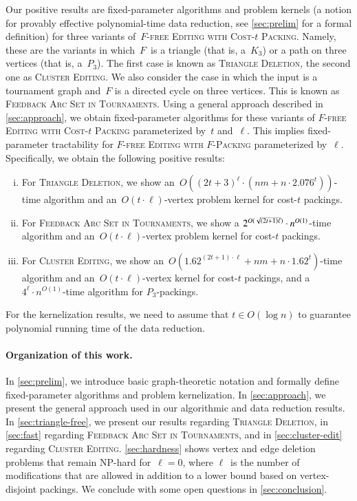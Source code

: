 \documentclass[envcountsame,numbook,smallextended]{svjour3}
\newcommand{\shorten}[1]{}
\numberwithin{equation}{section}
\numberwithin{figure}{section}
\newcommand{\ffedv}{\textsc{$F$-free Editing with $F$-Packing}}
\newcommand{\tffedv}{\textsc{$F$-free Editing with Cost-$t$ Packing}}
\begin{document}
  Our positive results are fixed-parameter algorithms and problem kernels (a notion for provably effective polynomial-time data reduction, see \cref{sec:prelim} for a formal definition) for three variants of~\tffedv{}.  Namely, these are the variants in which~$F$~is a triangle (that is, a~$K_3$) or a
path on three vertices (that is, a~$P_3$). The first case is known as
\textsc{Triangle Deletion}, the second one as \textsc{Cluster
  Editing}.  We also consider the case in which the input is a
tournament graph and~$F$ is a directed cycle on three vertices. This
is known as \textsc{Feedback Arc Set in Tournaments}.
Using a general approach described in \cref{sec:approach}, we obtain fixed-parameter algorithms for these variants of \tffedv{} parameterized by~$t$ and~$\ell$.  This implies fixed-parameter tractability for \ffedv{} parameterized by~$\ell$.  Specifically, we obtain the following positive results:
\shorten{Applying this framework plus some problem-specific data reduction and
branching rules yields the following particular results:}
\begin{enumerate}[(i)]
\item For \textsc{Triangle Deletion}, we show an~$O((2t+3)^\ell \cdot (nm + n\cdot 2.076^t))$-time algorithm and an~$O(t\cdot
  \ell)$-vertex problem kernel for cost-$t$ packings.
\item For \textsc{Feedback Arc Set in Tournaments}, we show a
  $2^{\smash{O(\sqrt{(2t+1)\ell})}} \cdot n^{O(1)}$-time algorithm and
  an~$O(t\cdot\ell)$-vertex problem kernel for cost-$t$ packings.
\item For \textsc{Cluster Editing}, we show an~$O(1.62^{(2t+1)\cdot
    \ell} + nm + n\cdot 1.62^t)$-time algorithm and an~$O(t\cdot
  \ell)$-vertex kernel for cost-$t$ packings, and a~$4^\ell\cdot
  n^{O(1)}$-time algorithm for $P_3$-packings.
\end{enumerate}
For the kernelization results, we need to assume that $t\in O(\log n)$
to guarantee polynomial running time of the data reduction. 

\paragraph{Organization of this work.}
In \cref{sec:prelim}, we introduce basic graph-theoretic notation and formally define fixed-parameter algorithms and problem kernelization.  In \cref{sec:approach}, we present the general approach used in our algorithmic and data reduction results.  In \cref{sec:triangle-free}, we present our results regarding \textsc{Triangle Deletion}, in \cref{sec:fast} regarding \textsc{Feedback Arc Set in Tournaments}, and in \cref{sec:cluster-edit} regarding \textsc{Cluster Editing}.  \cref{sec:hardness} shows vertex and edge deletion problems that remain NP-hard for~\(\ell=0\), where \(\ell\)~is the number of modifications that are allowed in addition to a lower bound based on vertex-disjoint packings.  We conclude with some open questions in \cref{sec:conclusion}.
\end{document}
